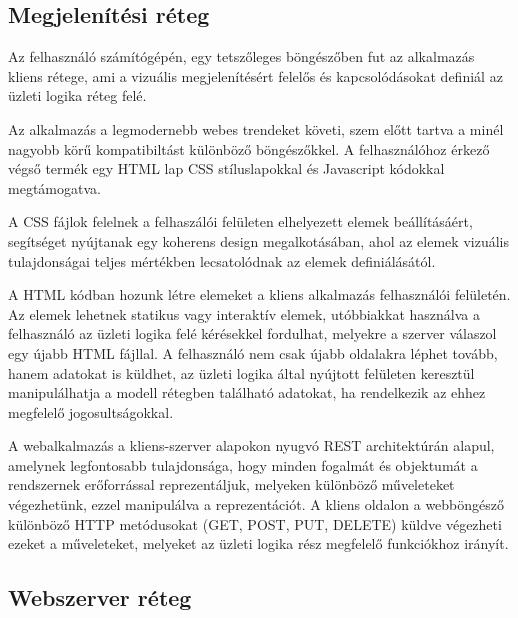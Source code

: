 \subsection{Megjelenítési réteg}\label{sect:kliens_reteg}

Az felhasználó számítógépén, egy tetszőleges böngészőben fut az alkalmazás kliens rétege, ami a vizuális megjelenítésért felelős és kapcsolódásokat definiál az üzleti logika réteg felé.

\bigskip

Az alkalmazás a legmodernebb webes trendeket követi, szem előtt tartva a minél nagyobb körű kompatibiltást különböző böngészőkkel. A felhasználóhoz érkező végső termék egy HTML lap CSS stíluslapokkal és Javascript kódokkal megtámogatva.

\bigskip 

A CSS fájlok felelnek a felhaszálói felületen elhelyezett elemek beállításáért, segítséget nyújtanak egy koherens design megalkotásában, ahol az elemek vizuális tulajdonságai teljes mértékben lecsatolódnak az elemek definiálásától.

\bigskip

A HTML kódban hozunk létre elemeket a kliens alkalmazás felhasználói felületén. Az elemek lehetnek statikus vagy interaktív elemek, utóbbiakkat használva a felhasználó az üzleti logika felé kérésekkel fordulhat, melyekre a szerver válaszol egy újabb HTML fájllal. A felhasználó nem csak újabb oldalakra léphet tovább, hanem adatokat is küldhet, az üzleti logika által nyújtott felületen keresztül manipulálhatja a modell rétegben található adatokat, ha rendelkezik az ehhez megfelelő jogosultságokkal.

\bigskip

A webalkalmazás a kliens-szerver alapokon nyugvó REST architektúrán alapul, amelynek legfontosabb tulajdonsága, hogy minden fogalmát és objektumát a rendszernek erőforrással reprezentáljuk, melyeken különböző műveleteket végezhetünk, ezzel manipulálva a reprezentációt. A kliens oldalon a webböngésző különböző HTTP metódusokat (GET, POST, PUT, DELETE) küldve végezheti ezeket a műveleteket, melyeket az üzleti logika rész megfelelő funkciókhoz irányít.

\subsection{Webszerver réteg}\label{sect:szerver_reteg}

